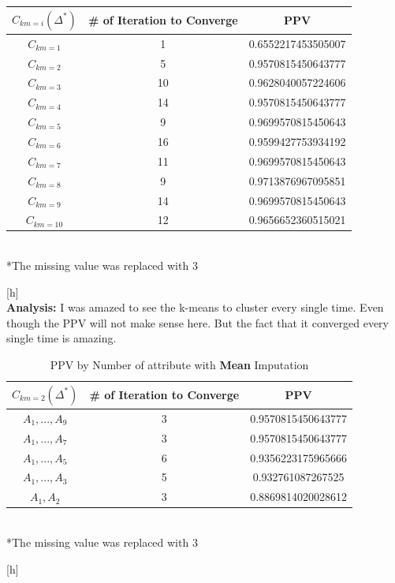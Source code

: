 \documentclass{article}
\begin{document}
\begin{enumerate}
\begin{table}[h]
				\centering
				\begin{tabular}{c|cc}
					\\
					\hline
					$C_{km=i} (\Delta^*)$ & \# of Iteration to Converge & PPV \\
					\hline
					$C_{km=1}$ & 1 & 0.6552217453505007\\
					$C_{km=2}$ & 5 & 0.9570815450643777\\
					$C_{km=3}$ & 10 & 0.9628040057224606\\
					$C_{km=4}$ & 14 & 0.9570815450643777\\
					$C_{km=5}$  & 9 & 0.9699570815450643\\
					$C_{km=6}$  & 16 & 0.9599427753934192\\
					$C_{km=7}$  & 11 & 0.9699570815450643\\
					$C_{km=8}$  & 9 & 0.9713876967095851\\
					$C_{km=9}$  & 14 & 0.9699570815450643\\
					$C_{km=10}$  & 12 & 0.9656652360515021\\
					\hline	
				\end{tabular} \\
				*The missing value was replaced with 3
			\end{table}[h] \\	
			\textbf{Analysis:} I was amazed to see the k-means to cluster every single time. Even though the PPV will not make sense here. But the fact that it converged every single time is amazing. 		



			\begin{table}[h]
				\caption{PPV by Number of attribute with \textbf{Mean} Imputation}

				\centering
				\begin{tabular}{c|c c}
					\\
					\hline
					$C_{km=2} (\Delta^*)$ & \# of Iteration to Converge & PPV \\
					\hline
					$A_1, . . . , A_9$ & 3 & 0.9570815450643777\\
					$A_1, . . . , A_7$ & 3 & 0.9570815450643777\\
					$A_1, . . . , A_5$ & 6 & 0.9356223175965666\\
					$A_1, . . . , A_3$ & 5 & 0.932761087267525\\
					$A_1, A_2$  & 3 & 0.8869814020028612\\
					\hline	
				\end{tabular} \\
				*The missing value was replaced with 3
			\end{table}[h] \\			


\end{enumerate}
\end{document}
